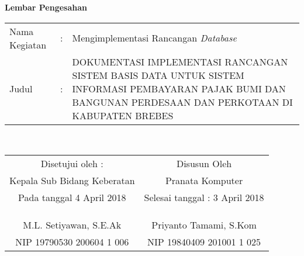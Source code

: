 \begin{center}
{\huge \bfseries Lembar Pengesahan}\\[0.4cm]

\begin{tabular}{l c p{10cm}}
  Nama Kegiatan & : & Mengimplementasi Rancangan \textit{Database} \\
  Judul & : & DOKUMENTASI IMPLEMENTASI RANCANGAN SISTEM BASIS DATA UNTUK SISTEM INFORMASI PEMBAYARAN PAJAK BUMI DAN BANGUNAN PERDESAAN DAN PERKOTAAN DI KABUPATEN BREBES \\
\end{tabular}\\[2cm]

\begin{tabular}{c c}
  Disetujui oleh : & Disusun Oleh \\
  Kepala Sub Bidang Keberatan & Pranata Komputer \\
  Pada tanggal 4 April 2018 & Selesai tanggal : 3 April 2018 \\
  & \\
  & \\
  & \\
  M.L. Setiyawan, S.E.Ak & Priyanto Tamami, S.Kom \\
  NIP 19790530 200604 1 006 & NIP 19840409 201001 1 025
\end{tabular}

\end{center}